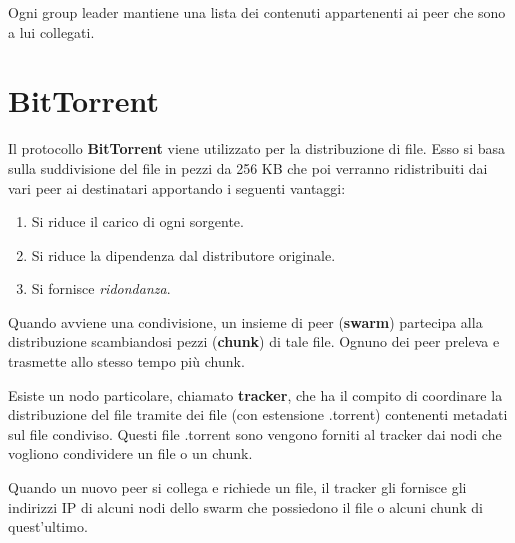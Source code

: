 Ogni group leader mantiene una lista dei contenuti appartenenti ai peer
che sono a lui collegati.

\section{BitTorrent}
Il protocollo \textbf{BitTorrent} viene utilizzato per la 
distribuzione di file. Esso si basa sulla suddivisione del file in
pezzi da 256 KB che poi verranno ridistribuiti dai vari peer ai 
destinatari apportando i seguenti vantaggi:
\begin{enumerate}
	\item Si riduce il carico di ogni sorgente.
	\item Si riduce la dipendenza dal distributore originale.
	\item Si fornisce \emph{ridondanza}.
\end{enumerate}
Quando avviene una condivisione, un insieme di peer (\textbf{swarm})
partecipa alla distribuzione scambiandosi pezzi (\textbf{chunk}) di 
tale file. Ognuno dei peer preleva e trasmette allo stesso tempo più
chunk.

Esiste un nodo particolare, chiamato \textbf{tracker}, che ha il
compito di coordinare la distribuzione del file tramite dei file (con
estensione .torrent) contenenti metadati sul file condiviso. Questi
file .torrent sono vengono forniti al tracker dai nodi che vogliono
condividere un file o un chunk.

Quando un nuovo peer si collega e richiede un file, il tracker gli 
fornisce gli indirizzi IP di alcuni nodi dello swarm che possiedono
il file o alcuni chunk di quest'ultimo.

